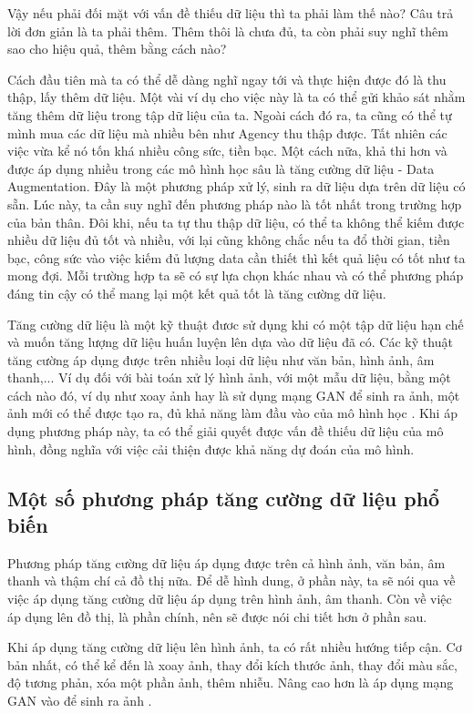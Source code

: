 Vậy nếu phải đối mặt với vấn đề thiếu dữ liệu thì ta phải làm thế nào? Câu trả lời đơn giản là ta phải thêm. Thêm thôi là chưa đủ, ta còn phải suy nghĩ thêm sao cho hiệu quả, thêm bằng cách nào?

Cách đầu tiên mà ta có thể dễ dàng nghĩ ngay tới và thực hiện được đó là thu thập, lấy thêm dữ liệu. Một vài ví dụ cho việc này là ta có thể gửi khảo sát nhằm tăng thêm dữ liệu trong tập dữ liệu của ta. Ngoài cách đó ra, ta cũng có thể tự mình mua các dữ liệu mà nhiều bên như Agency thu thập được. Tất nhiên các việc vừa kể nó tốn khá nhiều công sức, tiền bạc. Một cách nữa, khả thi hơn và được áp dụng nhiều trong các mô hình học sâu là tăng cường dữ liệu - Data Augmentation. Đây là một phương pháp xử lý, sinh ra dữ liệu dựa trên dữ liệu có sẵn. Lúc này, ta cần suy nghĩ đến phương pháp nào là tốt nhất trong trường hợp của bản thân. Đôi khi, nếu ta tự thu thập dữ liệu, có thể ta không thể kiếm được nhiều dữ liệu đủ tốt và nhiều, với lại cũng không chắc nếu ta đổ thời gian, tiền bạc, công sức vào việc kiếm đủ lượng data cần thiết thì kết quả liệu có tốt như ta mong đợi. Mỗi trường hợp ta sẽ có sự lựa chọn khác nhau và có thể phương pháp đáng tin cậy có thể mang lại một kết quả tốt là tăng cường dữ liệu.

Tăng cường dữ liệu là một kỹ thuật đươc sử dụng khi có một tập dữ liệu hạn chế và muốn tăng lượng dữ liệu huấn luyện lên dựa vào dữ liệu đã có. Các kỹ thuật tăng cường áp dụng được trên nhiều loại dữ liệu như văn bản, hình ảnh, âm thanh,... Ví dụ đối với bài toán xử lý hình ảnh, với một mẫu dữ liệu, bằng một cách nào đó, ví dụ như xoay ảnh hay là sử dụng mạng GAN để sinh ra ảnh, một ảnh mới có thể được tạo ra, đủ khả năng làm đầu vào của mô hình học \cite{effectiveness-data-aug}. Khi áp dụng phương pháp này, ta có thể giải quyết được vấn đề thiếu dữ liệu của mô hình, đồng nghĩa với việc cải thiện được khả năng dự đoán của mô hình.

\subsection{Một số phương pháp tăng cường dữ liệu phổ biến}
\noindent Phương pháp tăng cường dữ liệu áp dụng được trên cả hình ảnh, văn bản, âm thanh và thậm chí cả đồ thị nữa. Để dễ hình dung, ở phần này, ta sẽ nói qua về việc áp dụng tăng cường dữ liệu áp dụng trên hình ảnh, âm thanh. Còn về việc áp dụng lên đồ thị, là phần chính, nên sẽ được nói chi tiết hơn ở phần sau.

Khi áp dụng tăng cường dữ liệu lên hình ảnh, ta có rất nhiều hướng tiếp cận. Cơ bản nhất, có thể kể đến là xoay ảnh, thay đổi kích thước ảnh, thay đổi màu sắc, độ tương phản, xóa một phần ảnh, thêm nhiễu. Nâng cao hơn là áp dụng mạng GAN vào để sinh ra ảnh \cite{survey:img-aug-for-deeplearning}.

